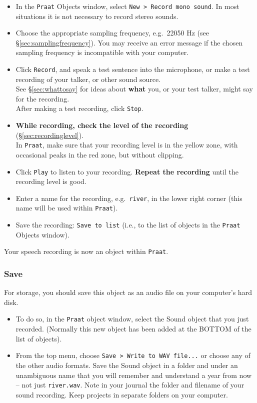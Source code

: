 \documentclass[
]{book}
\begin{document}
\begin{itemize}
\item
  In the \texttt{Praat} Objects window, select \texttt{New\ \textgreater{}\ Record\ mono\ sound}.
  In most situations it is not necessary to record stereo sounds.
\item
  Choose the appropriate sampling frequency, e.g.~22050 Hz (see §\ref{sec:samplingfrequency}). You may receive an error message if the chosen sampling frequency is incompatible with your computer.
\item
  Click \texttt{Record}, and speak a test sentence into the microphone, or make a test recording of your talker, or other sound source.\\
  See §\ref{sec:whattosay} for ideas about \textbf{what} you, or your test talker, might say for the recording.\\
  After making a test recording, click \texttt{Stop}.
\item
  \textbf{While recording, check the level of the recording} (§\ref{sec:recordinglevel}).\\
  In \texttt{Praat}, make sure that your recording level is in the yellow zone, with occasional peaks in the red zone, but without clipping.
\item
  Click \texttt{Play} to listen to your recording. \textbf{Repeat the recording} until the recording level is good.
\item
  Enter a name for the recording, e.g.~\texttt{river}, in the lower right corner (this name will be used within \texttt{Praat}).
\item
  Save the recording: \texttt{Save\ to\ list} (i.e., to the list of objects in the \texttt{Praat} Objects window).
\end{itemize}

Your speech recording is now an object within \texttt{Praat}.

\subsubsection{Save}\label{sec:praatsave}

For storage, you should save this object as an audio file on your computer's hard disk.

\begin{itemize}
\item
  To do so, in the \texttt{Praat} object window, select the Sound object that you just recorded. (Normally this new object has been added at the BOTTOM of the list of objects).
\item
  From the top menu, choose \texttt{Save\ \textgreater{}\ Write\ to\ WAV\ file...} or choose any of the other audio formats. Save the Sound object in a folder and under an unambiguous name that you will remember and understand a year from now -- not just \texttt{river.wav}. Note in your journal the folder and filename of your sound recording. Keep projects in separate folders on your computer.
\end{itemize}
\end{document}

